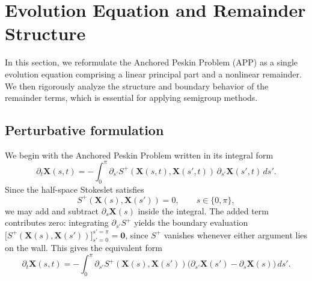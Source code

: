 \documentclass{amsart}
\newcommand{\mX}{\mathbf{X}}
\newtheorem{remark}{Remark}[section]
\begin{document}




\section{Evolution Equation and Remainder Structure}

In this section, we reformulate the Anchored Peskin Problem (APP) as a single evolution equation comprising a linear principal part and a nonlinear remainder. We then rigorously analyze the structure and boundary behavior of the remainder terms, which is essential for applying semigroup methods.

\subsection{Perturbative formulation}

We begin with the Anchored Peskin Problem written in its integral form
\[
\partial_t \mathbf{X}(s,t)
=
- \int_{0}^{\pi}
\partial_{s'} S^{+}(\mathbf{X}(s,t),\mathbf{X}(s',t))
\, \partial_{s'} \mathbf{X}(s',t)\, ds' .
\]
Since the half-space Stokeslet satisfies
\[
S^{+}(\mathbf{X}(s),\mathbf{X}(s')) = 0,
\qquad s \in \{0,\pi\},
\]
we may add and subtract $\partial_s \mathbf{X}(s)$ inside the integral. The added term contributes zero: integrating $\partial_{s'} S^+$ yields the boundary evaluation $\bigl[S^+(\mathbf{X}(s),\mathbf{X}(s'))\bigr]_{s'=0}^{s'=\pi} = \mathbf{0}$, since $S^+$ vanishes whenever either argument lies on the wall. This gives the equivalent form
\[
\partial_t \mathbf{X}(s,t)
=
- \int_{0}^{\pi}
\partial_{s'} S^{+}(\mathbf{X}(s),\mathbf{X}(s'))
\bigl(\partial_{s'} \mathbf{X}(s') - \partial_s \mathbf{X}(s)\bigr)\, ds' .
\]
\end{document}

